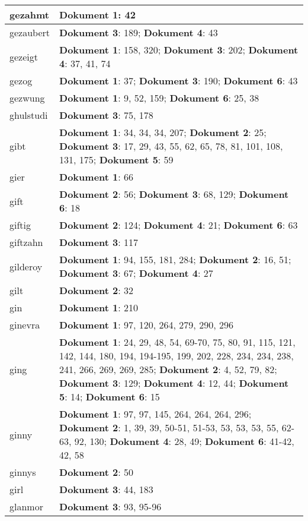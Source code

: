 \documentclass[a5paper]{article}
\begin{document}
\begin{longtable}[l]{|l|p{3in}|}
\hline
gezahmt & \textbf{Dokument 1}: 42 \\
\hline
gezaubert & \textbf{Dokument 3}: 189; \textbf{Dokument 4}: 43 \\
\hline
gezeigt & \textbf{Dokument 1}: 158, 320; \textbf{Dokument 3}: 202; \textbf{Dokument 4}: 37, 41, 74 \\
\hline
gezog & \textbf{Dokument 1}: 37; \textbf{Dokument 3}: 190; \textbf{Dokument 6}: 43 \\
\hline
gezwung & \textbf{Dokument 1}: 9, 52, 159; \textbf{Dokument 6}: 25, 38 \\
\hline
ghulstudi & \textbf{Dokument 3}: 75, 178 \\
\hline
gibt & \textbf{Dokument 1}: 34, 34, 34, 207; \textbf{Dokument 2}: 25; \textbf{Dokument 3}: 17, 29, 43, 55, 62, 65, 78, 81, 101, 108, 131, 175; \textbf{Dokument 5}: 59 \\
\hline
gier & \textbf{Dokument 1}: 66 \\
\hline
gift & \textbf{Dokument 2}: 56; \textbf{Dokument 3}: 68, 129; \textbf{Dokument 6}: 18 \\
\hline
giftig & \textbf{Dokument 2}: 124; \textbf{Dokument 4}: 21; \textbf{Dokument 6}: 63 \\
\hline
giftzahn & \textbf{Dokument 3}: 117 \\
\hline
gilderoy & \textbf{Dokument 1}: 94, 155, 181, 284; \textbf{Dokument 2}: 16, 51; \textbf{Dokument 3}: 67; \textbf{Dokument 4}: 27 \\
\hline
gilt & \textbf{Dokument 2}: 32 \\
\hline
gin & \textbf{Dokument 1}: 210 \\
\hline
ginevra & \textbf{Dokument 1}: 97, 120, 264, 279, 290, 296 \\
\hline
ging & \textbf{Dokument 1}: 24, 29, 48, 54, 69-70, 75, 80, 91, 115, 121, 142, 144, 180, 194, 194-195, 199, 202, 228, 234, 234, 238, 241, 266, 269, 269, 285; \textbf{Dokument 2}: 4, 52, 79, 82; \textbf{Dokument 3}: 129; \textbf{Dokument 4}: 12, 44; \textbf{Dokument 5}: 14; \textbf{Dokument 6}: 15 \\
\hline
ginny & \textbf{Dokument 1}: 97, 97, 145, 264, 264, 264, 296; \textbf{Dokument 2}: 1, 39, 39, 50-51, 51-53, 53, 53, 53, 55, 62-63, 92, 130; \textbf{Dokument 4}: 28, 49; \textbf{Dokument 6}: 41-42, 42, 58 \\
\hline
ginnys & \textbf{Dokument 2}: 50 \\
\hline
girl & \textbf{Dokument 3}: 44, 183 \\
\hline
glanmor & \textbf{Dokument 3}: 93, 95-96 \\

\end{longtable}
\end{document}
